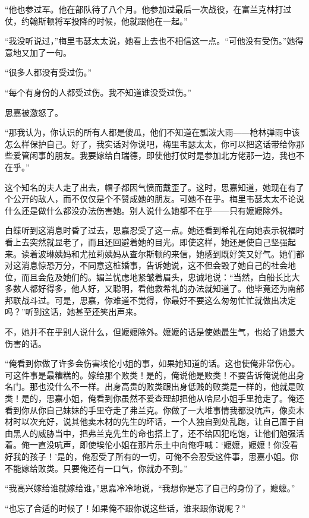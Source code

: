 \par “他也参过军。他在部队待了八个月。他参加过最后一次战役，在富兰克林打过仗，约翰斯顿将军投降的时候，他就跟他在一起。”
\par “我没听说过，”梅里韦瑟太太说，她看上去也不相信这一点。“可他没有受伤。”她得意地又加了一句。
\par “很多人都没有受过伤。”
\par “每个有身份的人都受过伤。我不知道谁没受过伤。”
\par 思嘉被激怒了。
\par “那我认为，你认识的所有人都是傻瓜，他们不知道在瓢泼大雨——枪林弹雨中该怎么样保护自己。好了，我实话对你说吧，梅里韦瑟太太，你可以把这话带给你那些爱管闲事的朋友。我要嫁给白瑞德，即使他打仗时是参加北方佬那一边，我也不在乎。”
\par 这个知名的夫人走了出去，帽子都因气愤而戴歪了。这时，思嘉知道，她现在有了个公开的敌人，而不仅仅是个不赞成她的朋友。可她不在乎。梅里韦瑟太太不论说什么还是做什么都没办法伤害她。别人说什么她都不在乎——只有嬷嬷除外。
\par 白蝶听到这消息时昏了过去，思嘉忍受了这一点。她还看到希礼在向她表示祝福时看上去突然就显老了，而且还回避着她的目光。即使这样，她还是使自己坚强起来。读着波琳姨妈和尤拉莉姨妈从查尔斯顿的来信，她感到既好笑又好气。她们都对这消息惊恐万分，不同意这桩婚事，告诉她说，这不但会毁了她自己的社会地位，而且会危及她们的。媚兰忧虑地紧皱着眉头，忠诚地说：“当然，白船长比大多数人都好得多，他人好，又聪明，看他救希礼的办法就知道了。他毕竟还为南部邦联战斗过。可是，思嘉，你难道不觉得，你最好不要这么匆匆忙忙就做出决定吗？”听到这话，她甚至还笑出声来。
\par 不，她并不在乎别人说什么，但嬷嬷除外。嬷嬷的话是使她最生气，也给了她最大伤害的话。
\par “俺看到你做了许多会伤害埃伦小姐的事，如果她知道的话。这也使俺非常伤心。可这件事是最糟糕的。嫁给那个败类！是的，俺说他是败类！不要告诉俺说他出身名门。那也没什么不一样。出身高贵的败类跟出身低贱的败类是一样的，他就是败类！是的，思嘉小姐，俺看到你虽然不爱查理却把他从哈尼小姐手里抢走了。俺还看到你从你自己妹妹的手里夺走了弗兰克。你做了一大堆事情我都没吭声，像卖木材时以次充好，说其他卖木材的先生的坏话，一个人独自到处乱跑，让自己置于自由黑人的威胁当中，把弗兰克先生的命也搭上了，还不给囚犯吃饱，让他们勉强活着。俺一直没吭声，即使埃伦小姐在那片乐土中向俺呼喊：‘嬷嬷，嬷嬷！你没看好我的孩子！’是的，俺忍受了所有的一切，可俺不会忍受这件事，思嘉小姐。你不能嫁给败类。只要俺还有一口气，你就办不到。”
\par “我高兴嫁给谁就嫁给谁，”思嘉冷冷地说，“我想你是忘了自己的身份了，嬷嬷。”
\par “也忘了合适的时候了！如果俺不跟你说这些话，谁来跟你说呢？”

